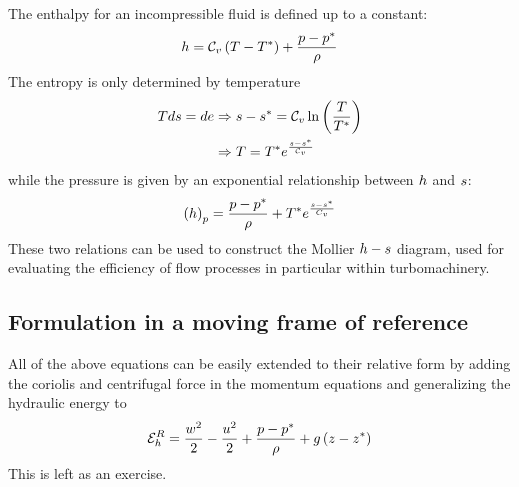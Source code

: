 The enthalpy for an incompressible fluid is defined up to a constant:
\begin{align*}
  h = \mathcal C_v \left(T - T^\ast\right) + \frac{p - p^\ast}{\rho} 
\end{align*}
The entropy is only determined by temperature
\begin{align*}
  T d s = d e &\Rightarrow 
  s - s^\ast = \mathcal C_v \ln \left(\frac{T}{T^\ast}\right) \\
  &\Rightarrow T = T^\ast e^{\frac{s-s^\ast}{\mathcal C_v}}
\end{align*} 
while the pressure is given by an exponential relationship between
$h$ and $s$:
\begin{align*}
  \left(h\right)_{p} = \frac{p - p^\ast}{\rho} + T^\ast e^{\frac{s-s^\ast}{C_v}}
\end{align*}
These two relations can be used to construct the Mollier $h-s$
diagram, used for evaluating the efficiency of flow processes in
particular within turbomachinery. 

\subsection{Formulation in a moving frame of reference}

All of the above equations can be easily extended to their relative
form by adding the coriolis and centrifugal force in the momentum
equations and generalizing the hydraulic energy to
\begin{align*}
  \mathcal E_h^R = 
  \frac{w^2}{2} - 
  \frac{u^2}{2} + 
  \frac{p - p^\ast}{\rho} + 
  g \left(z-z^\ast\right)
\end{align*}
This is left as an exercise.


